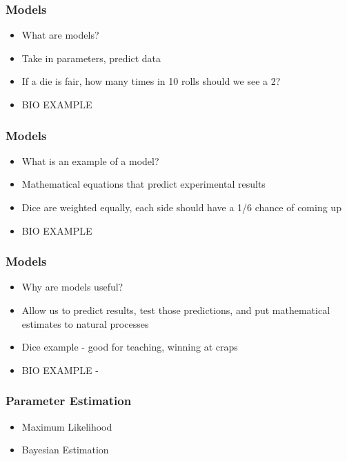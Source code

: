\documentclass[14pt,handout]{beamer}
\begin{document}
\begin{frame}
\frametitle{Models}
\begin{itemize}
	\item<+-> What are models?
	\item<+-> Take in parameters, predict data
	\item<+-> If a die is fair, how many times in 10 rolls should we see a 2?
	\item<+-> BIO EXAMPLE
\end{itemize}
\end{frame}

\begin{frame}
\frametitle{Models}
\begin{itemize}
	\item<+-> What is an example of a model?
	\item<+-> Mathematical equations that predict experimental results
	\item<+-> Dice are weighted equally, each side should have a 1/6 chance of coming up
	\item<+-> BIO EXAMPLE
\end{itemize}
\end{frame}

\begin{frame}
\frametitle{Models}
\begin{itemize}
	\item<+-> Why are models useful?
	\item<+-> Allow us to predict results, test those predictions, and put mathematical estimates to natural processes
	\item<+-> Dice example - good for teaching, winning at craps
	\item<+-> BIO EXAMPLE - 
\end{itemize}
\end{frame}

\begin{frame}
\frametitle{Parameter Estimation}
\begin{itemize}
	\item<+-> Maximum Likelihood
	\item<+-> Bayesian Estimation
\end{itemize}
\end{frame}


\end{document}
